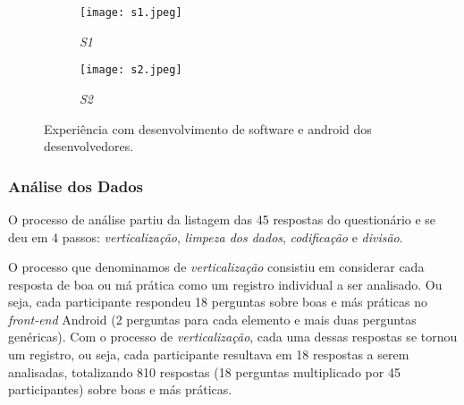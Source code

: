 \begin{figure*}[!t]
\centering
\begin{subfigure}{.5\textwidth}
 \centering
 \texttt{[image: s1.jpeg]}
 \caption{\textit{S1}}
 \label{fig:ExpDevsS1}
\end{subfigure}%
\begin{subfigure}{.5\textwidth}
 \centering
 \texttt{[image: s2.jpeg]}
 \caption{\textit{S2}}
 \label{fig:ExpDevsS2}
\end{subfigure}
\caption{Experiência com desenvolvimento de software e android dos desenvolvedores.}
\label{fig:ExpDevs}
\end{figure*}



\subsubsection{Análise dos Dados}
\label{sub:smells-definition}

O processo de análise partiu da listagem das 45 respostas do questionário e se deu em 4 passos: \textit{verticalização}, \textit{limpeza dos dados}, \textit{codificação} e \textit{divisão}.

O processo que denominamos de \textit{verticalização} consistiu em considerar cada resposta de boa ou má prática como um registro individual a ser analisado. Ou seja, cada participante respondeu 18 perguntas sobre boas e más práticas no \textit{front-end} Android (2 perguntas para cada elemento e mais duas perguntas genéricas). Com o processo de \textit{verticalização}, cada uma dessas respostas se tornou um registro, ou seja, cada participante resultava em 18 respostas a serem analisadas, totalizando 810 respostas (18 perguntas multiplicado por 45 participantes) sobre boas e más práticas.


